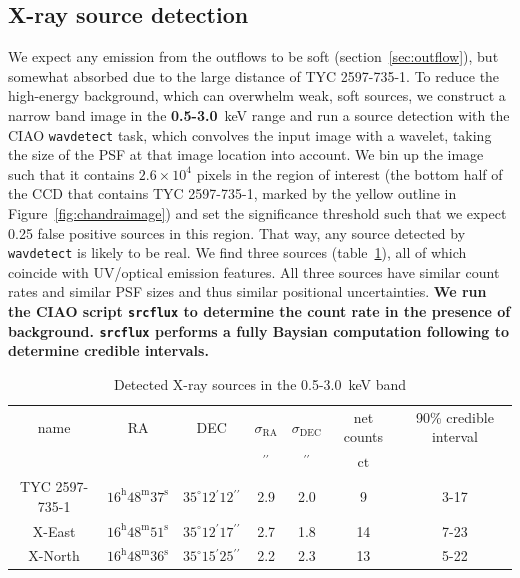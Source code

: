 \documentclass[linenumbers]{aastex631}
\begin{document}
\subsection{X-ray source detection}
\label{sec:xraydetection}
We expect any emission from the outflows to be soft (section~\ref{sec:outflow}), but somewhat absorbed due to the large distance of TYC 2597-735-1. To reduce the high-energy background, which can overwhelm weak, soft sources, we construct a narrow band image in the \textbf{0.5-3.0}~keV range
and run a source detection with the CIAO \texttt{wavdetect} task, which convolves the input image with a wavelet, taking the size of the PSF at that image location into account. We bin up the image such that it contains $2.6\times10^4$ pixels in the region of interest (the bottom half of the CCD that contains TYC 2597-735-1, marked by the yellow outline in Figure~\ref{fig:chandraimage}) and set the significance threshold such that we expect 0.25 false positive sources in this region. That way, any source detected by \texttt{wavdetect} is likely to be real. We find three sources (table~\ref{tab:src}), all of which coincide with UV/optical emission features. All three sources have similar count rates and similar PSF sizes and thus similar positional uncertainties. \textbf{We run the CIAO script \texttt{srcflux} to determine the count rate in the presence of background. \texttt{srcflux} performs a fully Baysian computation following \citet{2014ApJ...796...24P} to determine credible intervals.}

\begin{table}
\caption{Detected X-ray sources in the 0.5-3.0~keV band\label{tab:src}}
\begin{tabular}{ccccccc}
\hline \hline
name & RA & DEC & $\sigma_\mathrm{RA}$ & $\sigma_\mathrm{DEC}$ & net counts & 90\% credible interval \\
 &  &  & $\mathrm{{}^{\prime\prime}}$ & $\mathrm{{}^{\prime\prime}}$ & $\mathrm{ct}$ &  \\
\hline
TYC 2597-735-1 & $16^{\mathrm{h}}48^{\mathrm{m}}37^{\mathrm{s}}$ & $35^\circ12{}^\prime12{}^{\prime\prime}$ & 2.9 & 2.0 & 9 & 3-17 \\
X-East & $16^{\mathrm{h}}48^{\mathrm{m}}51^{\mathrm{s}}$ & $35^\circ12{}^\prime17{}^{\prime\prime}$ & 2.7 & 1.8 & 14 & 7-23 \\
X-North & $16^{\mathrm{h}}48^{\mathrm{m}}36^{\mathrm{s}}$ & $35^\circ15{}^\prime25{}^{\prime\prime}$ & 2.2 & 2.3 & 13 & 5-22 \\
\hline
\end{tabular}
\end{table}
\end{document}
